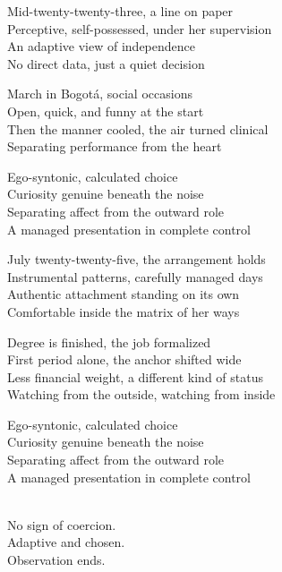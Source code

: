 \begin{lyrics}

Mid-twenty-twenty-three, a line on paper\\
Perceptive, self-possessed, under her supervision\\
An adaptive view of independence\\
No direct data, just a quiet decision

March in Bogotá, social occasions\\
Open, quick, and funny at the start\\
Then the manner cooled, the air turned clinical\\
Separating performance from the heart

Ego-syntonic, calculated choice\\
Curiosity genuine beneath the noise\\
Separating affect from the outward role\\
A managed presentation in complete control

July twenty-twenty-five, the arrangement holds\\
Instrumental patterns, carefully managed days\\
Authentic attachment standing on its own\\
Comfortable inside the matrix of her ways

Degree is finished, the job formalized\\
First period alone, the anchor shifted wide\\
Less financial weight, a different kind of status\\
Watching from the outside, watching from inside

Ego-syntonic, calculated choice\\
Curiosity genuine beneath the noise\\
Separating affect from the outward role\\
A managed presentation in complete control

\\
No sign of coercion.\\
Adaptive and chosen.\\
Observation ends.
\end{lyrics}

